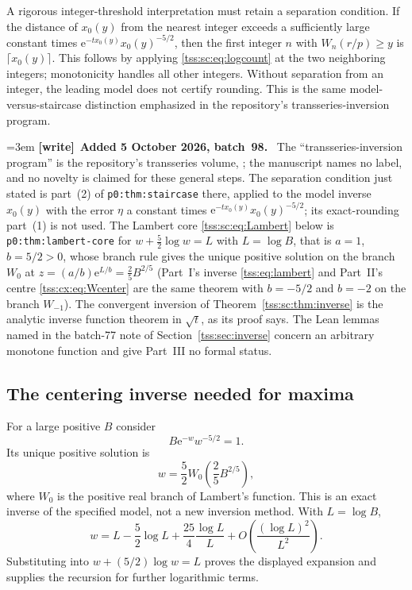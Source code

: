 \documentclass[11pt]{article}
\theoremstyle{remark}\newtheorem{remark}[theorem]{Remark}
\theoremstyle{definition}\newtheorem{definition}[theorem]{Definition}
\newcommand{\e}{\mathrm e}
\newenvironment{writenote}[1][]{\par\smallskip\begingroup\small\emergencystretch=3em
 \noindent\textbf{[write]}\if\relax\detokenize{#1}\relax\else~\textbf{#1.}\fi\ }%
 {\par\endgroup\smallskip}
\begin{document}
A rigorous integer-threshold interpretation must retain a separation condition. If the distance of $x_0(y)$ from the nearest integer exceeds a sufficiently large constant times
$\e^{-t x_0(y)}x_0(y)^{-5/2}$, then the first integer $n$ with $W_n(r/p)\geq y$ is $\lceil x_0(y)\rceil$. This follows by applying \eqref{tss:sc:eq:logcount} at the two neighboring integers; monotonicity handles all other integers. Without separation from an integer, the leading model does not certify rounding. This is the same model-versus-staircase distinction emphasized in the repository's transseries-inversion program.

\begin{writenote}[Added 5 October 2026, batch~98]
The ``transseries-inversion program'' is the repository's transseries
volume,
;
the manuscript names no label, and no novelty is claimed for these general
steps. The separation condition just stated is part~(2) of
\texttt{p0:thm:staircase} there, applied to the model inverse $x_0(y)$
with the error $\eta$ a constant times $\e^{-tx_0(y)}x_0(y)^{-5/2}$; its
exact-rounding part~(1) is not used. The Lambert core
\eqref{tss:sc:eq:Lambert} below is \texttt{p0:thm:lambert-core} for
$w+\tfrac52\log w=L$ with $L=\log B$, that is $a=1$, $b=5/2>0$, whose branch
rule gives the unique positive solution on the branch $W_0$ at
$z=(a/b)\e^{L/b}=\tfrac25B^{2/5}$ (Part~I's inverse \eqref{tss:eq:lambert}
and Part~II's centre \eqref{tss:cx:eq:Wcenter} are the same theorem with
$b=-5/2$ and $b=-2$ on the branch $W_{-1}$). The convergent inversion of
Theorem~\ref{tss:sc:thm:inverse} is the analytic inverse function theorem
in $\sqrt t$, as its proof says. The Lean lemmas named in the batch-77
note of Section~\ref{tss:sec:inverse} concern an arbitrary monotone
function and give Part~III no formal status.
\end{writenote}

\subsection{The centering inverse needed for maxima}
For a large positive $B$ consider
\begin{equation}\label{tss:sc:eq:wcore}
 B\e^{-w}w^{-5/2}=1.
\end{equation}
Its unique positive solution is
\begin{equation}\label{tss:sc:eq:Lambert}
 w=\frac52 W_0\left(\frac25 B^{2/5}\right),
\end{equation}
where $W_0$ is the positive real branch of Lambert's function. This is an exact inverse of the specified model, not a new inversion method. With $L=\log B$,
\begin{equation}\label{tss:sc:eq:wlog}
 w=L-\frac52\log L+\frac{25}{4}\frac{\log L}{L}
        +O\left(\frac{(\log L)^2}{L^2}\right).
\end{equation}
Substituting into $w+(5/2)\log w=L$ proves the displayed expansion and supplies the recursion for further logarithmic terms.
\end{document}
